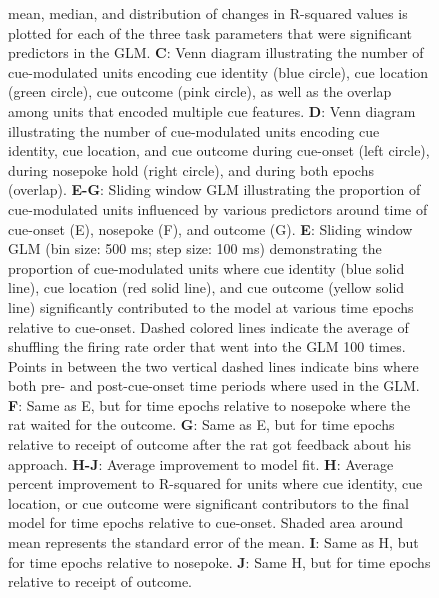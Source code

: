 \documentclass[11pt]{article}
\newcommand{\bsf}[1]{\textbf{#1}}
\begin{document}
\begin{figure}[ht!]
{mean, median, and distribution of changes in R-squared values is plotted for
each of the three task parameters that were significant predictors in the
GLM. \bsf{C}: Venn diagram illustrating the number of cue-modulated units encoding cue identity (blue circle), cue location (green circle), cue outcome (pink circle), as well as the overlap among units that encoded multiple cue features. \bsf{D}: Venn diagram illustrating the number of cue-modulated units encoding cue identity, cue location, and cue outcome during cue-onset (left circle), during nosepoke hold (right circle), and during both epochs (overlap). \bsf{E-G}: Sliding window GLM illustrating the proportion of cue-modulated units influenced by various predictors around time of cue-onset (E), nosepoke (F), and outcome (G). \bsf{E}: Sliding window GLM (bin size: 500 ms; step size: 100 ms) demonstrating the proportion of cue-modulated units where cue identity (blue solid line), cue location (red solid line), and cue outcome (yellow solid line) significantly contributed to the model at various time epochs relative to cue-onset. Dashed colored lines indicate the average of shuffling the firing rate order that went into the GLM 100 times. Points in between the two vertical dashed lines indicate bins where both pre- and post-cue-onset time periods where used in the GLM. \bsf{F}: Same as E, but for time epochs relative to nosepoke where the rat waited for the outcome. \bsf{G}: Same as E, but for time epochs relative to receipt of outcome after the rat got feedback about his approach. \bsf{H-J}: Average improvement to model fit. \bsf{H}: Average percent improvement to R-squared for units where cue identity, cue location, or cue outcome were significant contributors to the final model for time epochs relative to cue-onset. Shaded area around mean represents the standard error of the mean. \bsf{I}: Same as H, but for time epochs relative to nosepoke. \bsf{J}: Same H, but for time epochs relative to receipt of outcome.}
\label{fig:NP_GLM}
\end{figure} \clearpage
\end{document}
